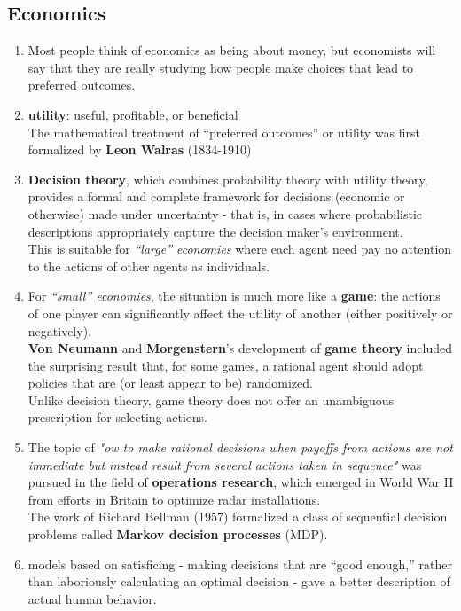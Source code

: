 \subsection{Economics}
\begin{enumerate}
    \item Most people think of economics as being about money, but economists will say that they are really studying how people make choices that lead to preferred outcomes. 

    \item \textbf{utility}: useful, profitable, or beneficial\\
    The mathematical treatment of “preferred outcomes” or utility was first formalized by \textbf{Leon Walras} (1834-1910)

    \item \textbf{Decision theory}, which combines probability theory with utility theory, provides a formal and complete framework for decisions (economic or otherwise) made under uncertainty - that is, in cases where probabilistic descriptions appropriately capture the decision maker’s environment.\\
    This is suitable for \textit{“large” economies} where each agent need pay no attention to the actions of other agents as individuals.

    \item For \textit{“small” economies}, the situation is much more like a \textbf{game}: the actions of one player can significantly affect the utility of another (either positively or negatively).\\
    \textbf{Von Neumann} and \textbf{Morgenstern}’s development of \textbf{game theory} included the surprising result that, for some games, a rational agent should adopt policies that are (or least appear to be) randomized.\\
    Unlike decision theory, game theory does not offer an unambiguous prescription for selecting actions.

    \item The topic of \textit{"ow to make rational decisions when payoffs from actions are not immediate but instead result from several actions taken in sequence"} was pursued in the field of \textbf{operations research}, which emerged in World War II from efforts in Britain to optimize radar installations.\\
    The work of Richard Bellman (1957) formalized a class of sequential decision problems called \textbf{Markov decision processes} (MDP).

    \item models based on satisficing - making decisions that are “good enough,” rather than laboriously calculating an optimal decision - gave a better description of actual human behavior.
\end{enumerate}

